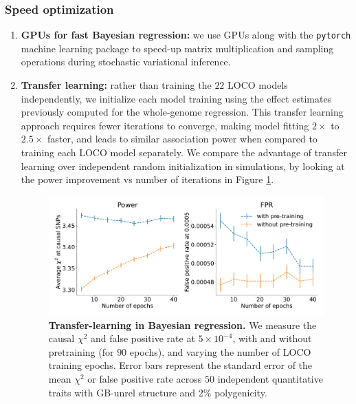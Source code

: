 \subsubsection{Speed optimization}
\begin{enumerate}
    \item \textbf{GPUs for fast Bayesian regression:} we use GPUs along with the \texttt{pytorch} machine learning package \cite{paszke2017automatic} to speed-up matrix multiplication and sampling operations during stochastic variational inference.
    \item \textbf{Transfer learning:} rather than training the $22$ LOCO models independently, we initialize each model training using the effect estimates previously computed for the whole-genome regression.
    This transfer learning approach requires fewer iterations to converge, making model fitting $2\times$ to $2.5\times$ faster, and leads to similar association power when compared to training each LOCO model separately.
    We compare the advantage of transfer learning over independent random initialization in simulations, by looking at the power improvement vs number of iterations in Figure \ref{fig:transfer}.

    \begin{figure}[h]
    \centering
    \includegraphics[width=\textwidth]{figures/transfer.pdf}
    \caption{\textbf{
    Transfer-learning in Bayesian regression.}
    We measure the causal $\chi^2$ and false positive rate at $5 \times 10^{-4}$, with and without pretraining (for $90$ epochs), and varying the number of LOCO training epochs.
    Error bars represent the standard error of the mean $\chi^2$ or false positive rate across $50$ independent quantitative traits with GB-unrel structure and $2\%$ polygenicity.
    }
    \label{fig:transfer}
\end{figure}
    


\end{enumerate}
